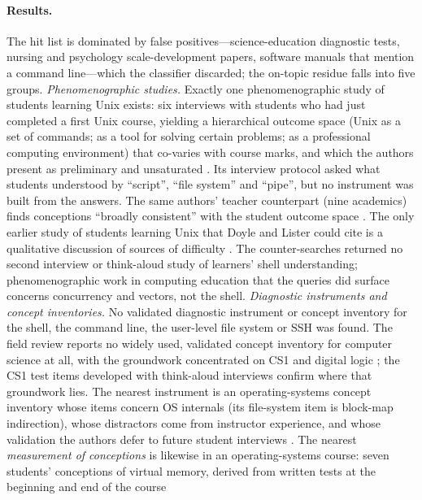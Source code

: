\paragraph{Results.}
The hit list is dominated by false positives---science-education
diagnostic tests, nursing and psychology scale-development papers,
software manuals that mention a command line---which the classifier
discarded; the on-topic residue falls into five groups.
\emph{Phenomenographic studies.}
Exactly one phenomenographic study of students learning Unix exists:
six interviews with students who had just completed a first Unix course,
yielding a hierarchical outcome space (Unix as a set of commands; as a tool
for solving certain problems; as a professional computing environment)
that co-varies with course marks, and which the authors present as
preliminary and unsaturated \autocite{DoyleLister2006Unix}.
Its interview protocol asked what students understood by
\enquote{script}, \enquote{file system} and \enquote{pipe}, but no
instrument was built from the answers.
The same authors' teacher counterpart (nine academics) finds conceptions
\enquote{broadly consistent} with the student outcome space
\autocite{DoyleLister2007WhyUnix}.
The only earlier study of students learning Unix that Doyle and Lister
could cite is a qualitative discussion of sources of difficulty
\autocite{Greening1996Unix}.
The counter-searches returned no second interview or think-aloud study of
learners' shell understanding; phenomenographic work in computing
education that the queries did surface concerns concurrency and vectors,
not the shell.
\emph{Diagnostic instruments and concept inventories.}
No validated diagnostic instrument or concept inventory for the shell, the
command line, the user-level file system or SSH was found.
The field review reports no widely used, validated concept inventory for
computer science at all, with the groundwork concentrated on CS1 and
digital logic \autocite{Taylor2014CI}; the CS1 test items developed with
think-aloud interviews \autocite{Vahrenhold2014TestItems} confirm where
that groundwork lies.
The nearest instrument is an operating-systems concept inventory whose
items concern OS internals (its file-system item is block-map
indirection), whose distractors come from instructor experience, and
whose validation the authors defer to future student interviews
\autocite{WebbTaylor2014OSCI}.
The nearest \emph{measurement of conceptions} is likewise in an
operating-systems course: seven students' conceptions of virtual memory,
derived from written tests at the beginning and end of the course
